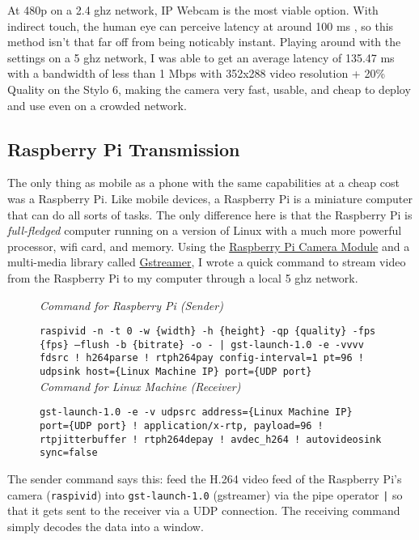 At 480p on a 2.4 ghz network, IP Webcam is the most viable option. With indirect touch, the human eye can perceive latency at around 100 ms \cite{LatencyStudy}, so this method isn't that far off from being noticably instant. Playing around with the settings on a 5 ghz network, I was able to get an average latency of 135.47 ms with a bandwidth of less than 1 Mbps with 352x288 video resolution + 20\% Quality on the Stylo 6, making the camera very fast, usable, and cheap to deploy and use even on a crowded network.

\subsection{Raspberry Pi Transmission}
The only thing as mobile as a phone with the same capabilities at a cheap cost was a Raspberry Pi. Like mobile devices, a Raspberry Pi is a miniature computer that can do all sorts of tasks. The only difference here is that the Raspberry Pi is \textit{full-fledged} computer running on a version of Linux with a much more powerful processor, wifi card, and memory. Using the \href{https://www.raspberrypi.org/products/camera-module-v2/}{Raspberry Pi Camera Module} and a multi-media library called \href{https://gstreamer.freedesktop.org/}{Gstreamer}, I wrote a quick command to stream video from the Raspberry Pi to my computer through a local 5 ghz network. 

\begin{figure}[h]
\begin{centering}

\textit{Command for Raspberry Pi (Sender)}

\texttt{raspivid -n -t 0 -w \{width\} -h \{height\} -qp \{quality\} -fps \{fps\} --flush -b \{bitrate\} -o - | gst-launch-1.0 -e -vvvv fdsrc ! h264parse ! rtph264pay config-interval=1 pt=96 ! udpsink host=\{Linux Machine IP\} port=\{UDP port\}} \\[1cm]

\textit{Command for Linux Machine (Receiver)}

\texttt{gst-launch-1.0 -e -v udpsrc address=\{Linux Machine IP\} port=\{UDP port\} ! application/x-rtp, payload=96 ! rtpjitterbuffer ! rtph264depay ! avdec\_h264 ! autovideosink sync=false}
\end{centering}
\end{figure}

The sender command says this: feed the H.264 video feed of the Raspberry Pi's camera (\texttt{raspivid}) into \texttt{gst-launch-1.0} (gstreamer) via the pipe operator \texttt{|} so that it gets sent to the receiver via a UDP connection. The receiving command simply decodes the data into a window.

